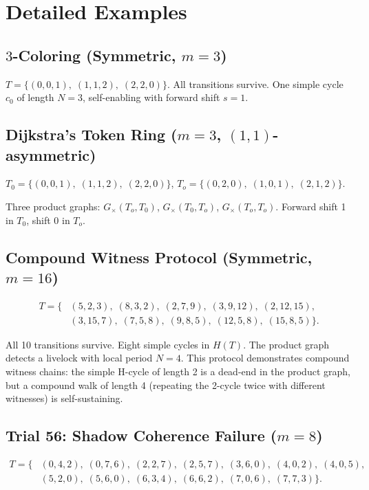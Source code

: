 \documentclass[11pt]{article}
\begin{document}
\section{Detailed Examples}
\label{sec:examples}

\subsection{$3$-Coloring (Symmetric, $m = 3$)}

$T = \{(0,0,1),\; (1,1,2),\; (2,2,0)\}$. All transitions survive. One simple cycle $c_0$ of length $N = 3$, self-enabling with forward shift $s = 1$.

\subsection{Dijkstra's Token Ring ($m = 3$, $(1,1)$-asymmetric)}

$T_0 = \{(0,0,1),\; (1,1,2),\; (2,2,0)\}$, $T_o = \{(0,2,0),\; (1,0,1),\; (2,1,2)\}$.

Three product graphs: $G_\times(T_o, T_0)$, $G_\times(T_0, T_o)$, $G_\times(T_o, T_o)$. Forward shift 1 in $T_0$, shift 0 in $T_o$.

\subsection{Compound Witness Protocol (Symmetric, $m = 16$)}

\begin{align*}
T = \{&(5,2,3),\; (8,3,2),\; (2,7,9),\; (3,9,12),\; (2,12,15),\\
      &(3,15,7),\; (7,5,8),\; (9,8,5),\; (12,5,8),\; (15,8,5)\}.
\end{align*}

All 10 transitions survive. Eight simple cycles in $H(T)$. The product graph detects a livelock with local period $N = 4$. This protocol demonstrates compound witness chains: the simple H-cycle of length 2 is a dead-end in the product graph, but a compound walk of length 4 (repeating the 2-cycle twice with different witnesses) is self-sustaining.

\subsection{Trial 56: Shadow Coherence Failure ($m = 8$)}

\begin{align*}
T = \{&(0,4,2),\; (0,7,6),\; (2,2,7),\; (2,5,7),\; (3,6,0),\; (4,0,2),\; (4,0,5),\\
      &(5,2,0),\; (5,6,0),\; (6,3,4),\; (6,6,2),\; (7,0,6),\; (7,7,3)\}.
\end{align*}
\end{document}
